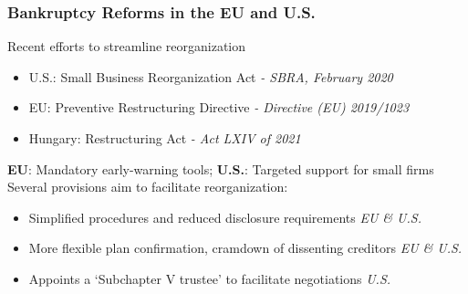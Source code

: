 \documentclass[aspectratio=169,xcolor=table]{beamer}
\begin{document}
\begin{frame}[label=EUandUS]  \frametitle{Bankruptcy Reforms in the EU and U.S. \hfill \hyperlink{sbra_emp}{} \hyperlink{SBRA}{}  }

Recent efforts to streamline reorganization
\begin{itemize} \small
    \item U.S.: Small Business Reorganization Act \hspace{11mm }\textit{- SBRA, February 2020} 
    \item EU: Preventive Restructuring Directive \hspace{12.32mm} \textit{- Directive (EU) 2019/1023}
    \item Hungary: Restructuring Act \hspace{28.2mm} \textit{- Act LXIV of 2021}
\end{itemize} \normalsize 
\textbf{EU}: Mandatory early-warning tools; \quad \textbf{U.S.}: Targeted support for small firms  \vspace{5mm} \\

Several provisions aim to facilitate reorganization:
\begin{itemize} \small
    \item Simplified procedures and reduced disclosure requirements \hfill \textit{EU \& U.S.}
    \item More flexible plan confirmation, cramdown of dissenting creditors \hfill \textit{EU \& U.S.}
    \item Appoints a `Subchapter V trustee' to facilitate negotiations \hfill \textit{U.S.} 
\end{itemize} \normalsize

\end{frame}
\end{document}
